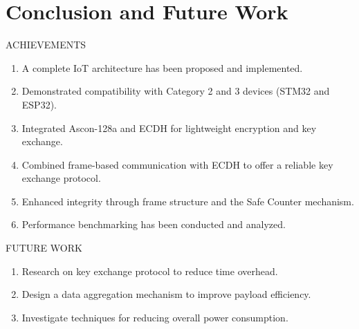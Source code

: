 \section{Conclusion and Future Work}
\begin{frame}{ACHIEVEMENTS}
\begin{enumerate}
	\item A complete IoT architecture has been proposed and implemented.
	\item Demonstrated compatibility with Category 2 and 3 devices (STM32 and ESP32).
	\item Integrated Ascon-128a and ECDH for lightweight encryption and key exchange.
	\item Combined frame-based communication with ECDH to offer a reliable key exchange protocol.
	\item Enhanced integrity through frame structure and the Safe Counter mechanism.
	\item Performance benchmarking has been conducted and analyzed.
\end{enumerate}
\end{frame}


\begin{frame}{FUTURE WORK}
\begin{enumerate}
	\item Research on key exchange protocol to reduce time overhead.
	\item Design a data aggregation mechanism to improve payload efficiency.
	\item Investigate techniques for reducing overall power consumption.
\end{enumerate}
\end{frame}
